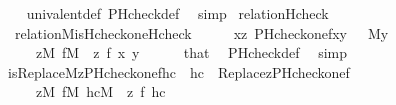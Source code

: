 \begin{isabellebody}
%
\isadelimproof
\ \ %
\endisadelimproof
%
\isatagproof
{}\isamarkupfalse%
\ univalent{\isacharunderscore}{\kern0pt}def\ PHcheck{\isacharunderscore}{\kern0pt}def\ \isamarkupfalse%
\ simp%
\endisatagproof
{\isafoldproof}%
%
\isadelimproof
\isanewline
%
\endisadelimproof
\isanewline
{}\isamarkupfalse%
\ relation{}{\isacharunderscore}{\kern0pt}Hcheck\ {\isacharcolon}{\kern0pt}\isanewline
\ \ {\isachardoublequoteopen}relation{}{\isacharparenleft}{\kern0pt}{\isacharhash}{\kern0pt}{\isacharhash}{\kern0pt}M{\isacharcomma}{\kern0pt}is{\isacharunderscore}{\kern0pt}Hcheck{\isacharparenleft}{\kern0pt}one{\isacharparenright}{\kern0pt}{\isacharcomma}{\kern0pt}Hcheck{\isacharparenright}{\kern0pt}{\isachardoublequoteclose}\isanewline
%
\isadelimproof
%
\endisadelimproof
%
\isatagproof
{}\isamarkupfalse%
\ {\isacharminus}{\kern0pt}\isanewline
\ \ \isamarkupfalse%
\ {}{\isacharcolon}{\kern0pt}{\isachardoublequoteopen}{\isasymlbrakk}x{\isasymin}z{\isacharsemicolon}{\kern0pt}\ PHcheck{\isacharparenleft}{\kern0pt}one{\isacharcomma}{\kern0pt}f{\isacharcomma}{\kern0pt}x{\isacharcomma}{\kern0pt}y{\isacharparenright}{\kern0pt}\ {\isasymrbrakk}\ {\isasymLongrightarrow}\ {\isacharparenleft}{\kern0pt}{\isacharhash}{\kern0pt}{\isacharhash}{\kern0pt}M{\isacharparenright}{\kern0pt}{\isacharparenleft}{\kern0pt}y{\isacharparenright}{\kern0pt}{\isachardoublequoteclose}\isanewline
\ \ \ \ \ {\isachardoublequoteopen}z{\isasymin}M{\isachardoublequoteclose}\ {\isachardoublequoteopen}f{\isasymin}M{\isachardoublequoteclose}\ \ z\ f\ x\ y\isanewline
\ \ \ \ \isamarkupfalse%
\ that\ \isamarkupfalse%
\ PHcheck{\isacharunderscore}{\kern0pt}def\ \isamarkupfalse%
\ simp\isanewline
\ \ \isamarkupfalse%
\ {\isachardoublequoteopen}is{\isacharunderscore}{\kern0pt}Replace{\isacharparenleft}{\kern0pt}{\isacharhash}{\kern0pt}{\isacharhash}{\kern0pt}M{\isacharcomma}{\kern0pt}z{\isacharcomma}{\kern0pt}PHcheck{\isacharparenleft}{\kern0pt}one{\isacharcomma}{\kern0pt}f{\isacharparenright}{\kern0pt}{\isacharcomma}{\kern0pt}hc{\isacharparenright}{\kern0pt}\ {\isasymlongleftrightarrow}\ hc\ {\isacharequal}{\kern0pt}\ Replace{\isacharparenleft}{\kern0pt}z{\isacharcomma}{\kern0pt}PHcheck{\isacharparenleft}{\kern0pt}one{\isacharcomma}{\kern0pt}f{\isacharparenright}{\kern0pt}{\isacharparenright}{\kern0pt}{\isachardoublequoteclose}\isanewline
\ \ \ \ \ {\isachardoublequoteopen}z{\isasymin}M{\isachardoublequoteclose}\ {\isachardoublequoteopen}f{\isasymin}M{\isachardoublequoteclose}\ {\isachardoublequoteopen}hc{\isasymin}M{\isachardoublequoteclose}\ \ z\ f\ hc\isanewline

\end{isabellebody}
